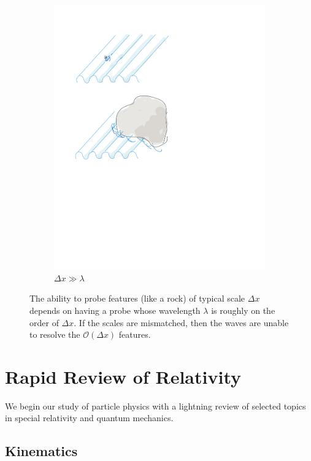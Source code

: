 \documentclass[12pt, oneside]{report}    %
\let\oldsection\section
\def\section{%
  \setcounter{sidenote}{1}%
  \oldsection
}
\begin{document}
\begin{figure}
\begin{subfigure}{0.3\textwidth}
        \includegraphics[width=\linewidth]{figures/waves_big.pdf}
        \caption{$\Delta x \gg \lambda$}
        \label{fig:subfig:waves:big}
    \end{subfigure}%
    \caption{The ability to probe features (like a rock) of typical scale $\Delta x$ depends on having a probe whose wavelength $\lambda$ is roughly on the order of $\Delta x$. If the scales are mismatched, then the waves are unable to resolve the $\mathcal O(\Delta x)$ features.}
    \label{fig:subfig:waves}
\end{figure}



\chapter{Rapid Review of Relativity}

We begin our study of particle physics with a lightning review of selected topics in special relativity and quantum mechanics.

\section{Kinematics}
\end{document}
